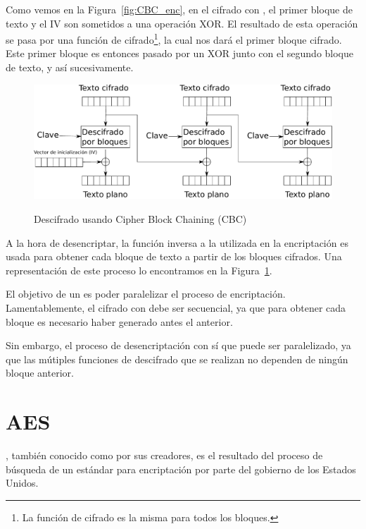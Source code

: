  Como vemos en la Figura~\ref{fig:CBC_enc}, en el cifrado con , el primer bloque de texto y el IV son sometidos a una operación XOR.
 El resultado de esta operación se pasa por una función de cifrado\footnote{La función de cifrado es la misma para todos los bloques.}, la cual nos dará el primer bloque cifrado.
 Este primer bloque es entonces pasado por un XOR junto con el segundo bloque de texto, y así sucesivamente.

 \begin{figure}[ht]
   \centering
   \includegraphics[scale=0.4]{Figures/CBC_dec}
   \decoRule
   \caption[Cipher Block Chaining (CBC) - Descifrado]{Descifrado usando Cipher Block Chaining (CBC)} \emph{\parencite{Reference2}}
   \label{fig:CBC_dec}
 \end{figure}

 A la hora de desencriptar, la función inversa a la utilizada en la encriptación
 es usada para obtener cada bloque de texto a partir de los bloques cifrados.
 Una representación de este proceso lo encontramos en la Figura~\ref{fig:CBC_dec}.

 El objetivo de un  es poder paralelizar el proceso de encriptación.
 Lamentablemente, el cifrado con  debe ser secuencial,
 ya que para obtener cada bloque es necesario haber generado antes el anterior.

 Sin embargo, el proceso de desencriptación con  sí que puede ser paralelizado,
 ya que las mútiples funciones de descifrado que se realizan no dependen de ningún bloque anterior. \emph{\parencite{Reference24}}


 \section{AES}

 , también conocido como  por sus creadores,
 es el resultado del proceso de búsqueda de un estándar para encriptación por parte del gobierno de los Estados Unidos.

